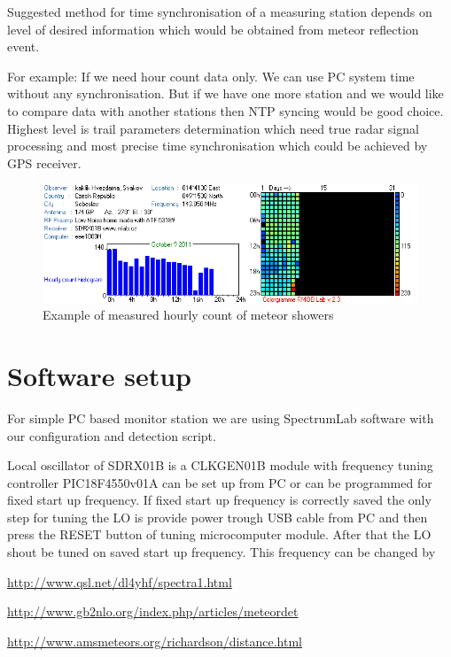 \documentclass[12pt,a4paper,oneside]{article}
\begin{document}
Suggested method for time synchronisation of a measuring station depends on level of desired information which would be obtained from meteor reflection event.    

For example: If we need hour count data only. We can use PC system time without any synchronisation. But if we have one more station and we would like to compare data with another stations then NTP syncing would be good choice.  Highest level is trail parameters determination which need true radar signal processing  and most precise time synchronisation which could be achieved by GPS receiver.

\begin{figure}[htbp]
\begin{center}
\includegraphics [width=150mm] {./img/colorgram.png} 
\end{center}
\caption{Example of measured hourly count of meteor showers}   
\end{figure}

\section{Software setup}

For simple PC based monitor station we are using SpectrumLab software with   our configuration and detection script. 

Local oscillator of SDRX01B is a CLKGEN01B module with frequency tuning controller  PIC18F4550v01A can be set up from PC or can be programmed for fixed start up frequency. If fixed start up frequency is correctly saved the only step for tuning the LO is provide power trough USB cable from PC and then press the RESET button of tuning microcomputer module. After that the LO shout be tuned on saved start up frequency. This frequency can be changed by   

\begin{thebibliography}{99}
\href{http://www.qsl.net/dl4yhf/spectra1.html}{http://www.qsl.net/dl4yhf/spectra1.html}

\href{http://www.gb2nlo.org/index.php/articles/meteordet}{http://www.gb2nlo.org/index.php/articles/meteordet}

\href{http://www.amsmeteors.org/richardson/distance.html}{http://www.amsmeteors.org/richardson/distance.html}




\end{thebibliography}
\end{document}
